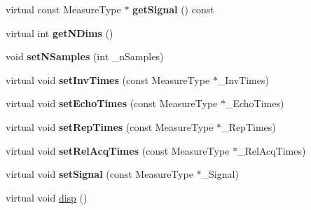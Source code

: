 \begin{DoxyCompactItemize}
\item 
\hypertarget{class_ox_1_1_model_ae51878e45fa528e47a457610d857a9bb}{virtual const Measure\-Type $\ast$ {\bfseries get\-Signal} () const }\label{class_ox_1_1_model_ae51878e45fa528e47a457610d857a9bb}

\item 
\hypertarget{class_ox_1_1_model_af457ac73701b13fa1b3af8d800e198dc}{virtual int {\bfseries get\-N\-Dims} ()}\label{class_ox_1_1_model_af457ac73701b13fa1b3af8d800e198dc}

\item 
\hypertarget{class_ox_1_1_model_a9e37f6db1210b7b4a58d7ad38ba6b422}{void {\bfseries set\-N\-Samples} (int \-\_\-n\-Samples)}\label{class_ox_1_1_model_a9e37f6db1210b7b4a58d7ad38ba6b422}

\item 
\hypertarget{class_ox_1_1_model_a2db9a20a6915dc41bce2deecec7c390a}{virtual void {\bfseries set\-Inv\-Times} (const Measure\-Type $\ast$\-\_\-\-Inv\-Times)}\label{class_ox_1_1_model_a2db9a20a6915dc41bce2deecec7c390a}

\item 
\hypertarget{class_ox_1_1_model_ac63fba341cfe586ec210f59fcdc0d715}{virtual void {\bfseries set\-Echo\-Times} (const Measure\-Type $\ast$\-\_\-\-Echo\-Times)}\label{class_ox_1_1_model_ac63fba341cfe586ec210f59fcdc0d715}

\item 
\hypertarget{class_ox_1_1_model_af272a398debaf156f345d85940bec556}{virtual void {\bfseries set\-Rep\-Times} (const Measure\-Type $\ast$\-\_\-\-Rep\-Times)}\label{class_ox_1_1_model_af272a398debaf156f345d85940bec556}

\item 
\hypertarget{class_ox_1_1_model_a534bfcec58d93c7002a6c0eb4d58ed88}{virtual void {\bfseries set\-Rel\-Acq\-Times} (const Measure\-Type $\ast$\-\_\-\-Rel\-Acq\-Times)}\label{class_ox_1_1_model_a534bfcec58d93c7002a6c0eb4d58ed88}

\item 
\hypertarget{class_ox_1_1_model_abb7eddc8c8c4ac94ab921158ce3a38a3}{virtual void {\bfseries set\-Signal} (const Measure\-Type $\ast$\-\_\-\-Signal)}\label{class_ox_1_1_model_abb7eddc8c8c4ac94ab921158ce3a38a3}

\item 
\hypertarget{class_ox_1_1_model_ae2c46e9820947efd450a93aaf53a0db5}{virtual void \hyperlink{class_ox_1_1_model_ae2c46e9820947efd450a93aaf53a0db5}{disp} ()}\label{class_ox_1_1_model_ae2c46e9820947efd450a93aaf53a0db5}


\end{DoxyCompactItemize}

